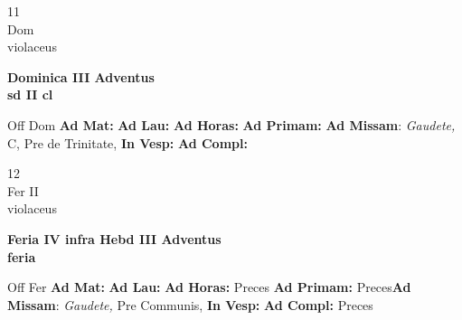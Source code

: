 \documentclass[10pt, openany]{book}
\begin{document}
    \begin{center}
        \begin{minipage}{3.5in}
            \vspace{2em}
            \begin{minipage}{0.5in}
                {\Huge 11} \\
                {\normalsize Dom} \\
                {\normalsize violaceus}
            \end{minipage}
            \begin{minipage}{3.0in}
                \textbf{ \large Dominica III Adventus \\
                \textnormal{\normalsize sd II cl}} \\ 
            \end{minipage}
            \begin{justify}Off Dom
                \textbf{Ad Mat: }
                \textbf{Ad Lau: }
                \textbf{Ad Horas: }
                \textbf{Ad Primam: }\textbf{Ad Missam}: \textit{Gaudete,} C, Pre de Trinitate,  
                \textbf{In Vesp: }
                \textbf{Ad Compl: }
            \end{justify}
        \end{minipage}
    \end{center}

    \begin{center}
        \begin{minipage}{3.5in}
            \vspace{2em}
            \begin{minipage}{0.5in}
                {\Huge 12} \\
                {\normalsize Fer II} \\
                {\normalsize violaceus}
            \end{minipage}
            \begin{minipage}{3.0in}
                \textbf{ \large Feria IV infra Hebd III Adventus \\
                \textnormal{\normalsize feria}} \\ 
            \end{minipage}
            \begin{justify}Off Fer
                \textbf{Ad Mat: }
                \textbf{Ad Lau: }
                \textbf{Ad Horas: }Preces
                \textbf{Ad Primam: }Preces\textbf{Ad Missam}: \textit{Gaudete,} Pre Communis,  
                \textbf{In Vesp: }
                \textbf{Ad Compl: }Preces
            \end{justify}
        \end{minipage}
    \end{center}
\end{document}
